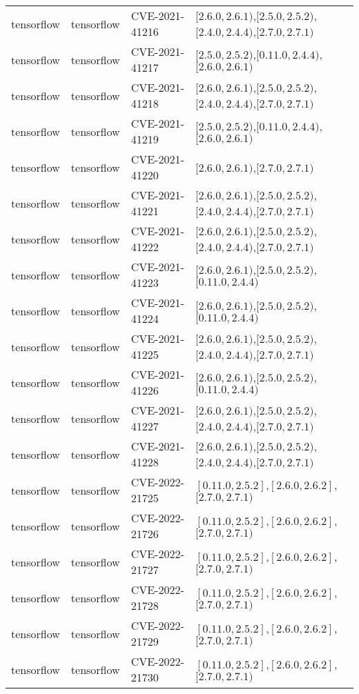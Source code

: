 \begin{tabular}{llll}
tensorflow & tensorflow & CVE-2021-41216 & $[2.6.0,2.6.1)$,$[2.5.0,2.5.2)$,$[2.4.0,2.4.4)$,$[2.7.0,2.7.1)$ \\
tensorflow & tensorflow & CVE-2021-41217 & $[2.5.0,2.5.2)$,$[0.11.0,2.4.4)$,$[2.6.0,2.6.1)$ \\
tensorflow & tensorflow & CVE-2021-41218 & $[2.6.0,2.6.1)$,$[2.5.0,2.5.2)$,$[2.4.0,2.4.4)$,$[2.7.0,2.7.1)$ \\
tensorflow & tensorflow & CVE-2021-41219 & $[2.5.0,2.5.2)$,$[0.11.0,2.4.4)$,$[2.6.0,2.6.1)$ \\
tensorflow & tensorflow & CVE-2021-41220 & $[2.6.0,2.6.1)$,$[2.7.0,2.7.1)$ \\
tensorflow & tensorflow & CVE-2021-41221 & $[2.6.0,2.6.1)$,$[2.5.0,2.5.2)$,$[2.4.0,2.4.4)$,$[2.7.0,2.7.1)$ \\
tensorflow & tensorflow & CVE-2021-41222 & $[2.6.0,2.6.1)$,$[2.5.0,2.5.2)$,$[2.4.0,2.4.4)$,$[2.7.0,2.7.1)$ \\
tensorflow & tensorflow & CVE-2021-41223 & $[2.6.0,2.6.1)$,$[2.5.0,2.5.2)$,$[0.11.0,2.4.4)$ \\
tensorflow & tensorflow & CVE-2021-41224 & $[2.6.0,2.6.1)$,$[2.5.0,2.5.2)$,$[0.11.0,2.4.4)$ \\
tensorflow & tensorflow & CVE-2021-41225 & $[2.6.0,2.6.1)$,$[2.5.0,2.5.2)$,$[2.4.0,2.4.4)$,$[2.7.0,2.7.1)$ \\
tensorflow & tensorflow & CVE-2021-41226 & $[2.6.0,2.6.1)$,$[2.5.0,2.5.2)$,$[0.11.0,2.4.4)$ \\
tensorflow & tensorflow & CVE-2021-41227 & $[2.6.0,2.6.1)$,$[2.5.0,2.5.2)$,$[2.4.0,2.4.4)$,$[2.7.0,2.7.1)$ \\
tensorflow & tensorflow & CVE-2021-41228 & $[2.6.0,2.6.1)$,$[2.5.0,2.5.2)$,$[2.4.0,2.4.4)$,$[2.7.0,2.7.1)$ \\
tensorflow & tensorflow & CVE-2022-21725 & $[0.11.0,2.5.2]$,$[2.6.0,2.6.2]$,$[2.7.0,2.7.1)$ \\
tensorflow & tensorflow & CVE-2022-21726 & $[0.11.0,2.5.2]$,$[2.6.0,2.6.2]$,$[2.7.0,2.7.1)$ \\
tensorflow & tensorflow & CVE-2022-21727 & $[0.11.0,2.5.2]$,$[2.6.0,2.6.2]$,$[2.7.0,2.7.1)$ \\
tensorflow & tensorflow & CVE-2022-21728 & $[0.11.0,2.5.2]$,$[2.6.0,2.6.2]$,$[2.7.0,2.7.1)$ \\
tensorflow & tensorflow & CVE-2022-21729 & $[0.11.0,2.5.2]$,$[2.6.0,2.6.2]$,$[2.7.0,2.7.1)$ \\
tensorflow & tensorflow & CVE-2022-21730 & $[0.11.0,2.5.2]$,$[2.6.0,2.6.2]$,$[2.7.0,2.7.1)$ \\

\end{tabular}
